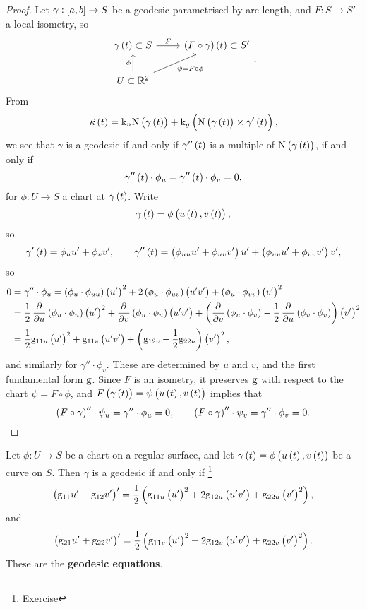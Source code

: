 \begin{proof}
Let $ \gamma : \sbr{a, b} \to S $ be a geodesic parametrised by arc-length, and $ F : S \to S' $ a local isometry, so
$$
\begin{tikzcd}
\gamma\br{t} \subset S \arrow{r}{F} & \br{F \circ \gamma}\br{t} \subset S' \\
U \subset \RR^2 \arrow{u}{\phi} \arrow{ur}[swap]{\psi = F \circ \phi}
\end{tikzcd}.
$$
From
$$ \vec{\kappa}\br{t} = \k_n\N\br{\gamma\br{t}} + \k_g\br{\N\br{\gamma\br{t}} \times \gamma'\br{t}}, $$
we see that $ \gamma $ is a geodesic if and only if $ \gamma''\br{t} $ is a multiple of $ \N\br{\gamma\br{t}} $, if and only if
$$ \gamma''\br{t} \cdot \phi_u = \gamma''\br{t} \cdot \phi_v = 0, $$
for $ \phi : U \to S $ a chart at $ \gamma\br{t} $. Write
$$ \gamma\br{t} = \phi\br{u\br{t}, v\br{t}}, $$
so
$$ \gamma'\br{t} = \phi_uu' + \phi_vv', \qquad \gamma''\br{t} = \br{\phi_{uu}u' + \phi_{uv}v'}u' + \br{\phi_{uv}u' + \phi_{vv}v'}v', $$
so
\begin{align*}
0
& = \gamma'' \cdot \phi_u
= \br{\phi_u \cdot \phi_{uu}}\br{u'}^2 + 2\br{\phi_u \cdot \phi_{uv}}\br{u'v'} + \br{\phi_u \cdot \phi_{vv}}\br{v'}^2 \\
& = \dfrac{1}{2}\dpd{}{u}\br{\phi_u \cdot \phi_u}\br{u'}^2 + \dpd{}{v}\br{\phi_u \cdot \phi_u}\br{u'v'} + \br{\dpd{}{v}\br{\phi_u \cdot \phi_v} - \dfrac{1}{2}\dpd{}{u}\br{\phi_v \cdot \phi_v}}\br{v'}^2 \\
& = \dfrac{1}{2}\g_{11u}\br{u'}^2 + \g_{11v}\br{u'v'} + \br{\g_{12v} - \dfrac{1}{2}\g_{22u}}\br{v'}^2,
\end{align*}
and similarly for $ \gamma'' \cdot \phi_v $. These are determined by $ u $ and $ v $, and the first fundamental form $ \mathrm{g} $. Since $ F $ is an isometry, it preserves $ \mathrm{g} $ with respect to the chart $ \psi = F \circ \phi $, and $ F\br{\gamma\br{t}} = \psi\br{u\br{t}, v\br{t}} $ implies that
$$ \br{F \circ \gamma}'' \cdot \psi_u = \gamma'' \cdot \phi_u = 0, \qquad \br{F \circ \gamma}'' \cdot \psi_v = \gamma'' \cdot \phi_v = 0. $$
\end{proof}

Let $ \phi : U \to S $ be a chart on a regular surface, and let $ \gamma\br{t} = \phi\br{u\br{t}, v\br{t}} $ be a curve on $ S $. Then $ \gamma $ is a geodesic if and only if \footnote{Exercise}
$$ \br{\g_{11}u' + \g_{12}v'}' = \dfrac{1}{2}\br{\g_{11u}\br{u'}^2 + 2\g_{12u}\br{u'v'} + \g_{22u}\br{v'}^2}, $$
and
$$ \br{\g_{21}u' + \g_{22}v'}' = \dfrac{1}{2}\br{\g_{11v}\br{u'}^2 + 2\g_{12v}\br{u'v'} + \g_{22v}\br{v'}^2}. $$
These are the \textbf{geodesic equations}.

